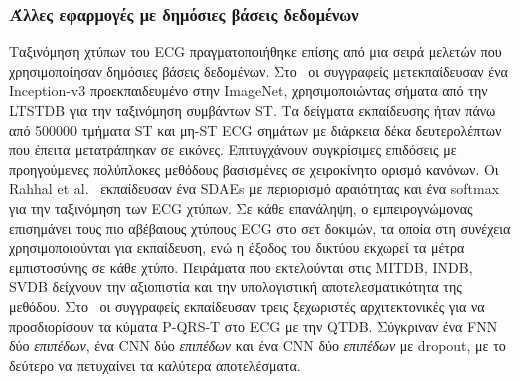 \subsubsection{Άλλες εφαρμογές με δημόσιες βάσεις δεδομένων}
Ταξινόμηση χτύπων του ECG πραγματοποιήθηκε επίσης από μια σειρά μελετών που χρησιμοποίησαν δημόσιες βάσεις δεδομένων.
Στο~\cite{xiao2018monitoring} οι συγγραφείς μετεκπαίδευσαν ένα Inception-v3 προεκπαιδευμένο στην ImageNet, χρησιμοποιώντας σήματα από την LTSTDB για την ταξινόμηση συμβάντων ST\@.
Τα δείγματα εκπαίδευσης ήταν πάνω από 500000 τμήματα ST και μη-ST ECG σημάτων με διάρκεια δέκα δευτερολέπτων που έπειτα μετατράπηκαν σε εικόνες.
Επιτυγχάνουν συγκρίσιμες επιδόσεις με προηγούμενες πολύπλοκες μεθόδους βασισμένες σε χειροκίνητο ορισμό κανόνων.
Οι Rahhal et al.~\cite{al2016deep} εκπαίδευσαν ένα SDAEs με περιορισμό αραιότητας και ένα softmax για την ταξινόμηση των ECG χτύπων.
Σε κάθε επανάληψη, ο εμπειρογνώμονας επισημάνει τους πιο αβέβαιους χτύπους ECG στο σετ δοκιμών, τα οποία στη συνέχεια χρησιμοποιούνται για εκπαίδευση, ενώ η έξοδος του δικτύου εκχωρεί τα μέτρα εμπιστοσύνης σε κάθε χτύπο.
Πειράματα που εκτελούνται στις MITDB, INDB, SVDB δείχνουν την αξιοπιστία και την υπολογιστική αποτελεσματικότητα της μεθόδου.
Στο~\cite{abrishami2018p} οι συγγραφείς εκπαίδευσαν τρεις ξεχωριστές αρχιτεκτονικές για να προσδιορίσουν τα κύματα P-QRS-T στο ECG με την QTDB\@.
Σύγκριναν ένα FNN δύο \textit{επιπέδων}, ένα CNN δύο \textit{επιπέδων} και ένα CNN δύο \textit{επιπέδων} με dropout, με το δεύτερο να πετυχαίνει τα καλύτερα αποτελέσματα.

